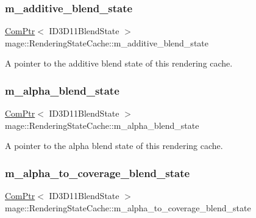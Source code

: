 \subsubsection{\texorpdfstring{m\+\_\+additive\+\_\+blend\+\_\+state}{m\_additive\_blend\_state}}
{\footnotesize\ttfamily \hyperlink{namespacemage_ae74f374780900893caa5555d1031fd79}{Com\+Ptr}$<$ I\+D3\+D11\+Blend\+State $>$ mage\+::\+Rendering\+State\+Cache\+::m\+\_\+additive\+\_\+blend\+\_\+state\hspace{0.3cm}{\ttfamily [private]}}

A pointer to the additive blend state of this rendering cache. \hypertarget{structmage_1_1_rendering_state_cache_a4eda3c0aeeaca45e4e07358267bb8ae6}{}\label{structmage_1_1_rendering_state_cache_a4eda3c0aeeaca45e4e07358267bb8ae6} 
\subsubsection{\texorpdfstring{m\+\_\+alpha\+\_\+blend\+\_\+state}{m\_alpha\_blend\_state}}
{\footnotesize\ttfamily \hyperlink{namespacemage_ae74f374780900893caa5555d1031fd79}{Com\+Ptr}$<$ I\+D3\+D11\+Blend\+State $>$ mage\+::\+Rendering\+State\+Cache\+::m\+\_\+alpha\+\_\+blend\+\_\+state\hspace{0.3cm}{\ttfamily [private]}}

A pointer to the alpha blend state of this rendering cache. \hypertarget{structmage_1_1_rendering_state_cache_a29e4108e7ec1c7583fc640ddf6fb2d13}{}\label{structmage_1_1_rendering_state_cache_a29e4108e7ec1c7583fc640ddf6fb2d13} 
\subsubsection{\texorpdfstring{m\+\_\+alpha\+\_\+to\+\_\+coverage\+\_\+blend\+\_\+state}{m\_alpha\_to\_coverage\_blend\_state}}
{\footnotesize\ttfamily \hyperlink{namespacemage_ae74f374780900893caa5555d1031fd79}{Com\+Ptr}$<$ I\+D3\+D11\+Blend\+State $>$ mage\+::\+Rendering\+State\+Cache\+::m\+\_\+alpha\+\_\+to\+\_\+coverage\+\_\+blend\+\_\+state\hspace{0.3cm}{\ttfamily [private]}}

